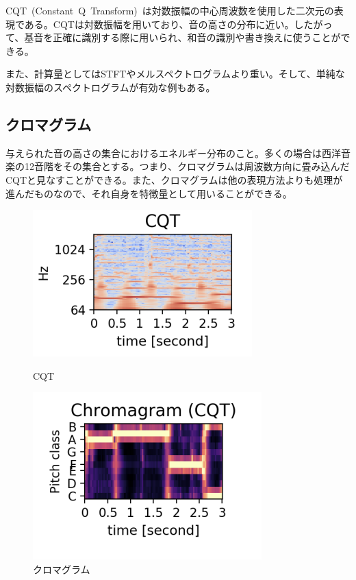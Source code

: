 CQT~(Constant~Q~Transform)~は対数振幅の中心周波数を使用した二次元の表現である。CQTは対数振幅を用いており、音の高さの分布に近い。したがって、基音を正確に識別する際に用いられ、和音の識別や書き換えに使うことができる。

また、計算量としてはSTFTやメルスペクトログラムより重い。そして、単純な対数振幅のスペクトログラムが有効な例もある。

\subsection{クロマグラム}

与えられた音の高さの集合におけるエネルギー分布のこと。多くの場合は西洋音楽の12音階をその集合とする。つまり、クロマグラムは周波数方向に畳み込んだCQTと見なすことができる。また、クロマグラムは他の表現方法よりも処理が進んだものなので、それ自身を特徴量として用いることができる。

\begin{figure}[b]
\centering
\begin{minipage}{0.48\columnwidth}
\centering
\includegraphics[width=\columnwidth]{figure/cqt.png}
\caption{CQT}
\label{fig:cqt}
\end{minipage}
\begin{minipage}{0.48\columnwidth}
\centering
\includegraphics[width=\columnwidth]{figure/choroma.png}
\caption{クロマグラム}
\label{fig:chroma}
\end{minipage}
\end{figure}
    
